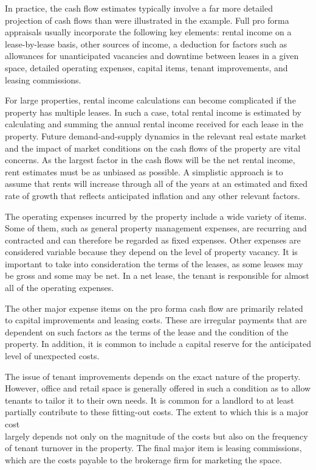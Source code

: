 \documentclass[11pt]{article}
\begin{document}
In practice, the cash flow estimates typically involve a far more detailed projection of cash flows than were illustrated in the example. Full pro forma appraisals usually incorporate the following key elements: rental income on a lease-by-lease basis, other sources of income, a deduction for factors such as allowances for unanticipated vacancies and downtime between leases in a given space, detailed operating expenses, capital items, tenant improvements, and leasing commissions.

For large properties, rental income calculations can become complicated if the property has multiple leases. In such a case, total rental income is estimated by calculating and summing the annual rental income received for each lease in the property. Future demand-and-supply dynamics in the relevant real estate market and the impact of market conditions on the cash flows of the property are vital concerns. As the largest factor in the cash flows will be the net rental income, rent estimates must be as unbiased as possible. A simplistic approach is to assume that rents will increase through all of the years at an estimated and fixed rate of growth that reflects anticipated inflation and any other relevant factors.

The operating expenses incurred by the property include a wide variety of items. Some of them, such as general property management expenses, are recurring and contracted and can therefore be regarded as fixed expenses. Other expenses are considered variable because they depend on the level of property vacancy. It is important to take into consideration the terms of the leases, as some leases may be gross and some may be net. In a net lease, the tenant is responsible for almost all of the operating expenses.

The other major expense items on the pro forma cash flow are primarily related to capital improvements and leasing costs. These are irregular payments that are dependent on such factors as the terms of the lease and the condition of the property. In addition, it is common to include a capital reserve for the anticipated level of unexpected costs.

The issue of tenant improvements depends on the exact nature of the property. However, office and retail space is generally offered in such a condition as to allow tenants to tailor it to their own needs. It is common for a landlord to at least partially contribute to these fitting-out costs. The extent to which this is a major cost\\
largely depends not only on the magnitude of the costs but also on the frequency of tenant turnover in the property. The final major item is leasing commissions, which are the costs payable to the brokerage firm for marketing the space.
\end{document}
